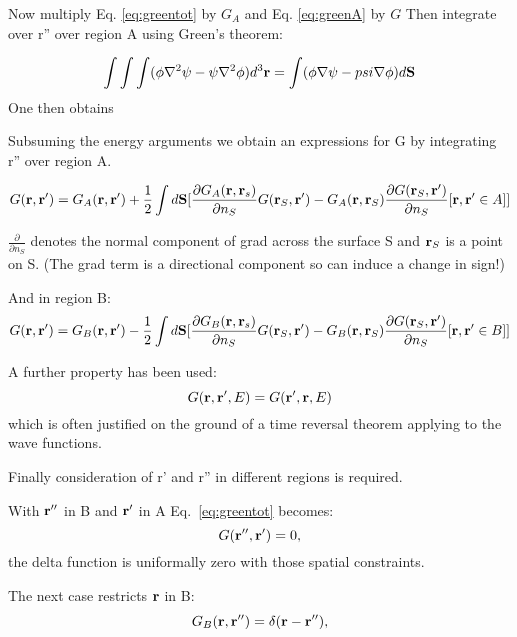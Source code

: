 \documentclass{article}
\def\r{{\bf r}}
\begin{document}
Now multiply Eq. \ref{eq:greentot} by $G_{A}$ and Eq.
\ref{eq:greenA} by $G$ Then integrate over r'' over region A using
Green's theorem:

\begin{equation}
\label{eq:greenthm}
\int\int\int(\phi\nabla^{2}\psi - \psi\nabla^{2}\phi)d^{3}\r 
= \int(\phi\nabla\psi-psi\nabla\phi)d{\mathbf{S}}
\end{equation}
 One then obtains

Subsuming the energy arguments we obtain an
expressions for G by integrating r'' over region A.

\begin{equation}
\label{eq:green1a}
G(\r,\r') = G_{A}(\r,\r') + \frac{1}{2} \int d\mathbf{S} 
[\frac{\partial G_{A}(\r,\r_{s})}{\partial n_{S}}G(\r_{S},\r')
- G_{A}(\r,\r_{S})\frac{\partial G(\r_{S},\r')}{\partial n_{S}} [\r, \r' \in A]]
\end{equation}

$\frac{\partial}{\partial n_{S}}$ denotes the normal component of grad across
the surface S and $\r_{S}$ is a point on S. (The grad term is a directional component
so can induce a change in sign!)

And in region B:
%
\begin{equation}
\label{eq:green1b}
G(\r,\r') = G_{B}(\r,\r') - \frac{1}{2} \int d\mathbf{S} 
[\frac{\partial G_{B}(\r,\r_{s})}{\partial n_{S}}G(\r_{S},\r')
- G_{B}(\r,\r_{S})\frac{\partial G(\r_{S},\r')}{\partial n_{S}} [\r, \r' \in B]]
\end{equation}
%

A further property has been used:
%
\begin{equation}
G(\r,\r',E) = G(\r',\r,E)
\end{equation}
%
which is often justified on the ground of a time reversal theorem
applying to the wave functions.

Finally consideration of r' and r'' in different regions is required.

With $\r''$ in B and $\r'$ in A Eq.~\ref{eq:greentot} becomes:
%
\begin{equation}
[-\frac{1}{2}\nabla^{2}_{\r''} + V(\r'') - E]G(\r'',\r')=0,
\end{equation}
%
the delta function is uniformally zero with those spatial constraints.

The next case restricts $\r$ in B:
%
\begin{equation}
[-\frac{1}{2}\nabla^{2}_{\r''} + V(\r'') - E]G_B(\r,\r'')= \delta(\r-\r''),
\end{equation}
%
\end{document}
